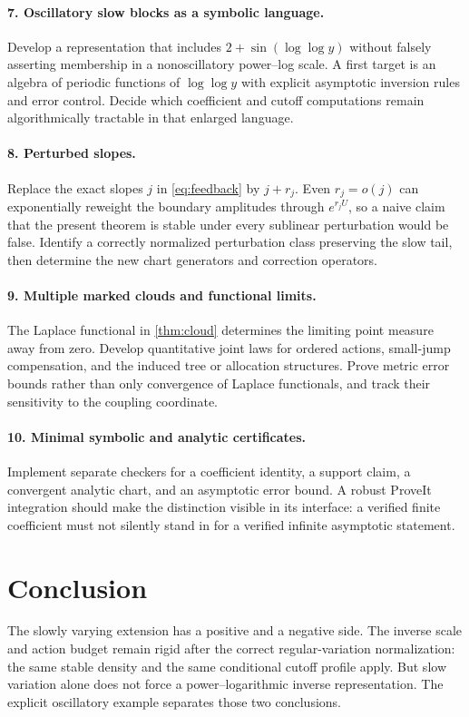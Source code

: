 \documentclass[11pt,a4paper]{article}
\numberwithin{equation}{section}
\theoremstyle{definition}\newtheorem{definition}[theorem]{Definition}
\theoremstyle{remark}\newtheorem{remark}[theorem]{Remark}
\theoremstyle{definition}
\begin{document}
\paragraph{7. Oscillatory slow blocks as a symbolic language.}
Develop a representation that includes
$2+\sin(\log\log y)$ without falsely asserting membership in a
nonoscillatory power--log scale. A first target is an algebra of periodic
functions of $\log\log y$ with explicit asymptotic inversion rules and
error control. Decide which coefficient and cutoff computations remain
algorithmically tractable in that enlarged language.

\paragraph{8. Perturbed slopes.}
Replace the exact slopes $j$ in \eqref{eq:feedback} by $j+r_j$.
Even $r_j=o(j)$ can exponentially reweight the boundary amplitudes through
$e^{r_jU}$, so a naive claim that the present theorem is stable under every
sublinear perturbation would be false. Identify a correctly normalized
perturbation class preserving the slow tail, then determine the new chart
generators and correction operators.

\paragraph{9. Multiple marked clouds and functional limits.}
The Laplace functional in \cref{thm:cloud} determines the limiting point
measure away from zero. Develop quantitative joint laws for ordered actions,
small-jump compensation, and the induced tree or allocation structures.
Prove metric error bounds rather than only convergence of Laplace
functionals, and track their sensitivity to the coupling coordinate.

\paragraph{10. Minimal symbolic and analytic certificates.}
Implement separate checkers for a coefficient identity, a support claim,
a convergent analytic chart, and an asymptotic error bound. A robust
ProveIt integration should make the distinction visible in its interface:
a verified finite coefficient must not silently stand in for a verified
infinite asymptotic statement.

\section{Conclusion}
The slowly varying extension has a positive and a negative side. The inverse
scale and action budget remain rigid after the correct regular-variation
normalization: the same stable density and the same conditional cutoff
profile apply. But slow variation alone does not force a power--logarithmic
inverse representation. The explicit oscillatory example separates those
two conclusions.
\end{document}
